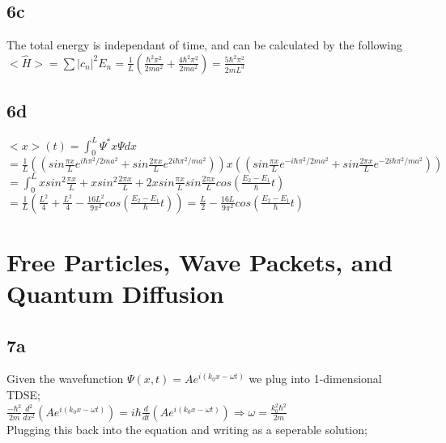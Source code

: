 \documentclass{article}
\begin{document}
\subsection*{6c}

The total energy is independant of time, and can be calculated by the following\\

$<\hat{H}>=\sum|c_n|^2E_n=\frac{1}{L}(\frac{\hbar^2\pi^2}{2ma^2}+\frac{4\hbar^2\pi^2}{2ma^2})=\frac{5\hbar^2\pi^2}{2mL^3}$\\

\subsection*{6d}

$<x>(t)={\displaystyle\int_0^L}\Psi^*x\Psi dx$\\

$=\frac{1}{L}((sin\frac{\pi x}{L}e^{i\hbar\pi^2/2ma^2}+sin\frac{2\pi x}{L}e^{2i\hbar\pi^2/ma^2}))x((sin\frac{\pi x}{L}e^{-i\hbar\pi^2/2ma^2}+sin\frac{2\pi x}{L}e^{-2i\hbar\pi^2/ma^2}))$\\

$={\displaystyle\int_0^L}xsin^2\frac{\pi x}{L}+xsin^2\frac{2\pi x}{L}+2xsin\frac{\pi x}{L}sin\frac{2\pi x}{L}cos(\frac{E_2-E_1}{\hbar}t)$\\

$=\frac{1}{L}(\frac{L^2}{4}+\frac{L^2}{4}-\frac{16L^2}{9\pi^2}cos(\frac{E_2-E_1}{\hbar}t))=\frac{L}{2}-\frac{16L}{9\pi^2}cos(\frac{E_2-E_1}{\hbar}t)$\\

\section*{Free Particles, Wave Packets, and Quantum Diffusion}

\subsection*{7a}

Given the wavefunction $\Psi(x,t)=Ae^{i(k_0x-\omega t)}$ we plug into 1-dimensional TDSE;\\

$\frac{-\hbar^2}{2m}\frac{d^2}{dx^2}(Ae^{i(k_0x-\omega t)})=i\hbar\frac{d}{dt}(Ae^{i(k_0x-\omega t)})\Rightarrow \omega=\frac{k_0^2\hbar^2}{2m}$\\

Plugging this back into the equation and writing as a seperable solution;\\
\end{document}
